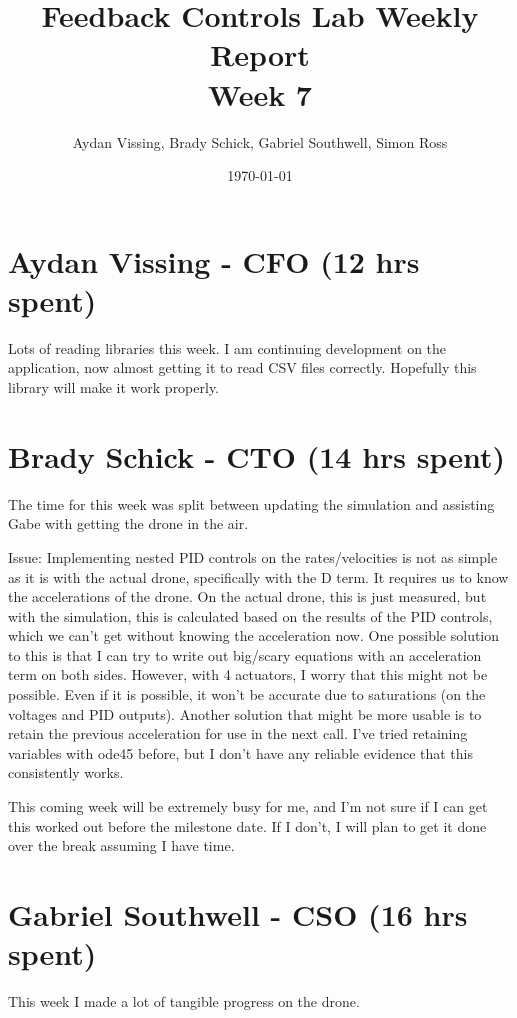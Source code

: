 \documentclass[12pt, titlepage]{article}
\title{Feedback Controls Lab Weekly Report \\ \normalsize{Week 7}}
\author{Aydan Vissing, Brady Schick, Gabriel Southwell, Simon Ross}
\date{\today}
\begin{document}
\maketitle

\section*{Aydan Vissing - CFO (12 hrs spent)}

Lots of reading libraries this week. I am continuing development on the application, now almost getting it to read CSV files correctly. Hopefully this library will make it work properly. 

\section*{Brady Schick - CTO (14 hrs spent)}

The time for this week was split between updating the simulation and assisting Gabe with getting the drone in the air.

Issue: Implementing nested PID controls on the rates/velocities is not as simple as it is with the actual drone, specifically with the D term. It requires us to know the accelerations of the drone. On the actual drone, this is just measured, but with the simulation, this is calculated based on the results of the PID controls, which we can't get without knowing the acceleration now. One possible solution to this is that I can try to write out big/scary equations with an acceleration term on both sides. However, with 4 actuators, I worry that this might not be possible. Even if it is possible, it won't be accurate due to saturations (on the voltages and PID outputs). Another solution that might be more usable is to retain the previous acceleration for use in the next call. I've tried retaining variables with ode45 before, but I don't have any reliable evidence that this consistently works.

This coming week will be extremely busy for me, and I'm not sure if I can get this worked out before the milestone date. If I don't, I will plan to get it done over the break assuming I have time.

\section*{Gabriel Southwell - CSO (16 hrs spent)}

This week I made a lot of tangible progress on the drone. 
\end{document}
